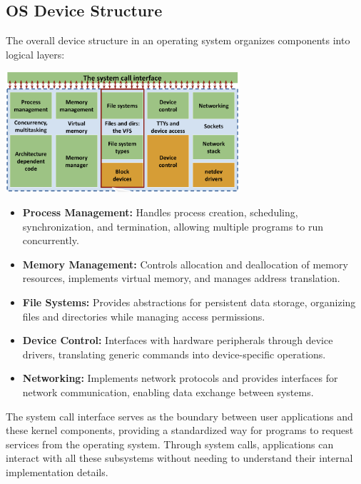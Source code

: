 \documentclass[../../compsys.tex]{subfiles}
\begin{document}
\subsection{OS Device Structure}

The overall device structure in an operating system organizes components into logical layers:

\begin{center}
    \includegraphics[width=0.65\textwidth]{chapters/L8/images/os.png}
\end{center}


\begin{itemize}
    \item \textbf{Process Management:} Handles process creation, scheduling, synchronization, and termination, allowing multiple programs to run concurrently.
    
    \item \textbf{Memory Management:} Controls allocation and deallocation of memory resources, implements virtual memory, and manages address translation.
    
    \item \textbf{File Systems:} Provides abstractions for persistent data storage, organizing files and directories while managing access permissions.
    
    \item \textbf{Device Control:} Interfaces with hardware peripherals through device drivers, translating generic commands into device-specific operations.
    
    \item \textbf{Networking:} Implements network protocols and provides interfaces for network communication, enabling data exchange between systems.
\end{itemize}

The system call interface serves as the boundary between user applications and these kernel components, providing a standardized way for programs to request services from the operating system. Through system calls, applications can interact with all these subsystems without needing to understand their internal implementation details.
\end{document}
